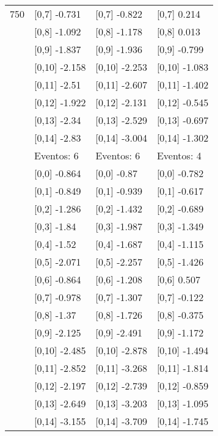 \begin{table}
\begin{tabular}[t]{llll}
750 & {}[0,7] -0.731 & {}[0,7] -0.822 & {}[0,7] 0.214\\
\addlinespace
 & {}[0,8] -1.092 & {}[0,8] -1.178 & {}[0,8] 0.013\\
 & {}[0,9] -1.837 & {}[0,9] -1.936 & {}[0,9] -0.799\\
 & {}[0,10] -2.158 & {}[0,10] -2.253 & {}[0,10] -1.083\\
 & {}[0,11] -2.51 & {}[0,11] -2.607 & {}[0,11] -1.402\\
 & {}[0,12] -1.922 & {}[0,12] -2.131 & {}[0,12] -0.545\\
\addlinespace
 & {}[0,13] -2.34 & {}[0,13] -2.529 & {}[0,13] -0.697\\
 & {}[0,14] -2.83 & {}[0,14] -3.004 & {}[0,14] -1.302\\
 & Eventos:  6 & Eventos:  6 & Eventos:  4\\
 & {}[0,0] -0.864 & {}[0,0] -0.87 & {}[0,0] -0.782\\
 & {}[0,1] -0.849 & {}[0,1] -0.939 & {}[0,1] -0.617\\
\addlinespace
 & {}[0,2] -1.286 & {}[0,2] -1.432 & {}[0,2] -0.689\\
 & {}[0,3] -1.84 & {}[0,3] -1.987 & {}[0,3] -1.349\\
 & {}[0,4] -1.52 & {}[0,4] -1.687 & {}[0,4] -1.115\\
 & {}[0,5] -2.071 & {}[0,5] -2.257 & {}[0,5] -1.426\\
 & {}[0,6] -0.864 & {}[0,6] -1.208 & {}[0,6] 0.507\\
\addlinespace
1000 & {}[0,7] -0.978 & {}[0,7] -1.307 & {}[0,7] -0.122\\
 & {}[0,8] -1.37 & {}[0,8] -1.726 & {}[0,8] -0.375\\
 & {}[0,9] -2.125 & {}[0,9] -2.491 & {}[0,9] -1.172\\
 & {}[0,10] -2.485 & {}[0,10] -2.878 & {}[0,10] -1.494\\
 & {}[0,11] -2.852 & {}[0,11] -3.268 & {}[0,11] -1.814\\
\addlinespace
 & {}[0,12] -2.197 & {}[0,12] -2.739 & {}[0,12] -0.859\\
 & {}[0,13] -2.649 & {}[0,13] -3.203 & {}[0,13] -1.095\\
 & {}[0,14] -3.155 & {}[0,14] -3.709 & {}[0,14] -1.745\\
\bottomrule
\end{tabular}
\end{table}
